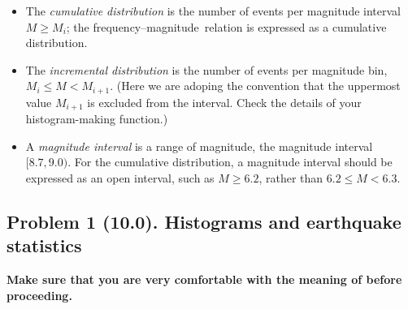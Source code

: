 \documentclass[11pt,titlepage,fleqn]{article}
\newcommand{\fmag}{frequency--magnitude}
\begin{document}
\begin{itemize}
\item The {\em cumulative distribution} is the number of events per magnitude interval $M \ge M_i$; the \fmag\ relation is expressed as a cumulative distribution.
\item The {\em incremental distribution} is the number of events per magnitude bin, $M_i \le M < M_{i+1}$. (Here we are adoping the convention that the uppermost value $M_{i+1}$ is excluded from the interval. Check the details of your histogram-making function.)
\item A {\em magnitude interval} is a range of magnitude, \eg the magnitude interval $[8.7,9.0)$. For the cumulative distribution, a magnitude interval should be expressed as an open interval, such as $M \ge 6.2$, rather than $6.2 \le M < 6.3$.
\end{itemize}



\pagebreak
\subsection*{Problem 1 (10.0). Histograms and earthquake statistics}

{\bf Make sure that you are very comfortable with the meaning of  before proceeding.}
\end{document}
